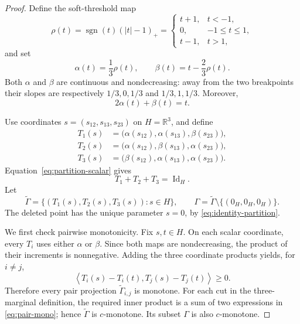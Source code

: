 \documentclass[11pt]{article}
\newcommand{\R}{\mathbb{R}}
\newcommand{\Id}{\operatorname{Id}}
\newcommand{\sgn}{\operatorname{sgn}}
\newcommand{\ip}[2]{\left\langle #1,#2\right\rangle}
\begin{document}
\begin{proof}
Define the soft-threshold map
\[
 \rho(t)=\sgn(t)(|t|-1)_+
 =\begin{cases}
 t+1,&t<-1,\\
 0,&-1\le t\le1,\\
 t-1,&t>1,
 \end{cases}
\]
and set
\[
 \alpha(t)=\frac13\rho(t),
 \qquad
 \beta(t)=t-\frac23\rho(t).
\]
Both \(\alpha\) and \(\beta\) are continuous and nondecreasing: away from
the two breakpoints their slopes are respectively \(1/3,0,1/3\) and
\(1/3,1,1/3\).  Moreover,
\begin{equation}\label{eq:partition-scalar}
 2\alpha(t)+\beta(t)=t.
\end{equation}

Use coordinates \(s=(s_{12},s_{13},s_{23})\) on \(H=\R^3\), and define
\[
\begin{aligned}
T_1(s)&=\bigl(\alpha(s_{12}),\alpha(s_{13}),\beta(s_{23})\bigr),\\
T_2(s)&=\bigl(\alpha(s_{12}),\beta(s_{13}),\alpha(s_{23})\bigr),\\
T_3(s)&=\bigl(\beta(s_{12}),\alpha(s_{13}),\alpha(s_{23})\bigr).
\end{aligned}
\]
Equation~\eqref{eq:partition-scalar} gives
\begin{equation}\label{eq:identity-partition}
 T_1+T_2+T_3=\Id_H.
\end{equation}
Let
\[
 \widetilde\Gamma
 =\{(T_1(s),T_2(s),T_3(s)):s\in H\},
 \qquad
 \Gamma=\widetilde\Gamma\setminus\{(0_H,0_H,0_H)\}.
\]
The deleted point has the unique parameter \(s=0\), by
\eqref{eq:identity-partition}.

We first check pairwise monotonicity.  Fix \(s,t\in H\).  On each scalar
coordinate, every \(T_i\) uses either \(\alpha\) or \(\beta\).  Since both
maps are nondecreasing, the product of their increments is nonnegative.
Adding the three coordinate products yields, for \(i\ne j\),
\begin{equation}\label{eq:pair-mono}
 \ip{T_i(s)-T_i(t)}{T_j(s)-T_j(t)}\ge0.
\end{equation}
Therefore every pair projection \(\widetilde\Gamma_{i,j}\) is monotone.
For each cut in the three-marginal definition, the required inner product is
a sum of two expressions in \eqref{eq:pair-mono}; hence
\(\widetilde\Gamma\) is \(c\)-monotone.  Its subset \(\Gamma\) is also
\(c\)-monotone.


\end{proof}
\end{document}

